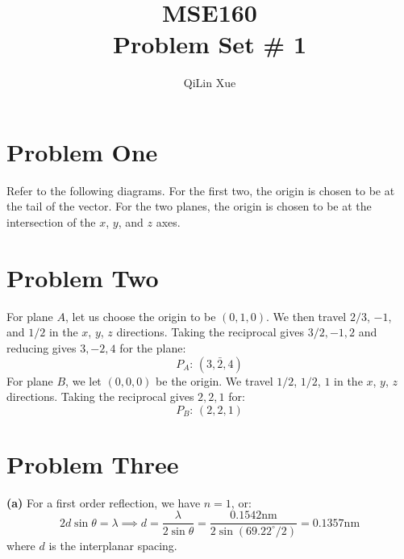 \documentclass{article}
\title{MSE160 \\ Problem Set \# 1}
\author{QiLin Xue}
\begin{document}
    \maketitle
    \section*{Problem One}
    Refer to the following diagrams. For the first two, the origin is chosen to be at the tail of the vector. For the two planes, the origin is chosen to be at the intersection of the $x$, $y$, and $z$ axes.
    \begin{figure}[ht]
        \centering
    \end{figure}
    \section*{Problem Two}
    For plane $A$, let us choose the origin to be $(0,1,0)$. We then travel $2/3$, $-1$, and $1/2$ in the $x$, $y$, $z$ directions. Taking the reciprocal gives $3/2, -1, 2$ and reducing gives $3, -2, 4$ for the plane:
    \begin{equation}
        P_A:\, (3,\bar{2},4)
    \end{equation}
    For plane $B$, we let $(0,0,0)$ be the origin. We travel $1/2$, $1/2$, $1$ in the $x$, $y$, $z$ directions. Taking the reciprocal gives $2,2,1$ for:
    \begin{equation}
        P_B:\, (2,2,1)
    \end{equation}
    \section*{Problem Three}
    \textbf{(a)} For a first order reflection, we have $n=1$, or:
    \begin{equation}
        2d\sin \theta = \lambda \implies d = \frac{\lambda}{2\sin\theta} = \frac{0.1542 \si{\nano\meter}}{2\sin(69.22^\circ/2)} = \boxed{0.1357\si{\nano\meter}}
    \end{equation}
    where $d$ is the interplanar spacing.
    
\end{document}

